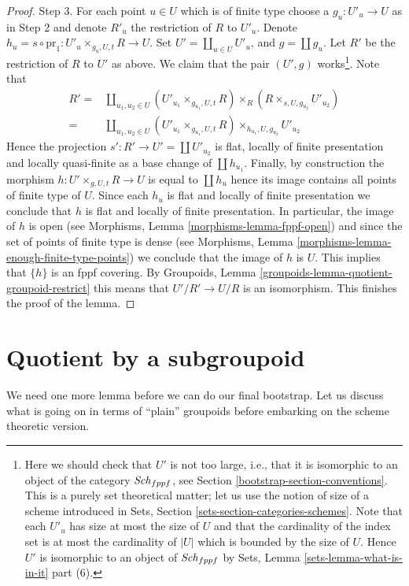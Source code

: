 \begin{proof}
\medskip\noindent
Step 3. For each point $u \in U$ which is of finite type
choose a $g_u : U'_u \to U$ as in
Step 2 and denote $R'_u$ the restriction of $R$ to $U'_u$.
Denote $h_u = s \circ \text{pr}_1 : U'_u \times_{g_u, U, t} R \to U$. Set
$U' = \coprod_{u \in U} U'_u$, and $g = \coprod g_u$. Let $R'$ be the
restriction of $R$ to $U'$ as above. We claim that
the pair $(U', g)$ works\footnote{Here we should check that $U'$ is not
too large, i.e., that it is isomorphic to an object of the category
$\mathit{Sch}_{fppf}$, see
Section \ref{bootstrap-section-conventions}.
This is a purely set theoretical matter; let us use the notion of size of
a scheme introduced in
Sets, Section \ref{sets-section-categories-schemes}.
Note that each $U'_u$ has size at most the size of $U$
and that the cardinality of the index set is at most the cardinality of
$|U|$ which is bounded by the size of $U$. Hence $U'$ is isomorphic
to an object of $\mathit{Sch}_{fppf}$ by
Sets, Lemma \ref{sets-lemma-what-is-in-it} part (6).}.
Note that
\begin{align*}
R' = &
\coprod\nolimits_{u_1, u_2 \in U}
(U'_{u_1} \times_{g_{u_1}, U, t} R)
\times_R
(R \times_{s, U, g_{u_2}} U'_{u_2}) \\
= &
\coprod\nolimits_{u_1, u_2 \in U}
(U'_{u_1} \times_{g_{u_1}, U, t} R) \times_{h_{u_1}, U, g_{u_2}} U'_{u_2}
\end{align*}
Hence the projection $s' : R' \to U' = \coprod U'_{u_2}$
is flat, locally of finite
presentation and locally quasi-finite as a base change of $\coprod h_{u_1}$.
Finally, by construction the morphism
$h : U' \times_{g, U, t} R \to U$ is equal to $\coprod h_u$ hence
its image contains all points of finite type of $U$.
Since each $h_u$ is flat and locally of finite presentation we conclude that
$h$ is flat and locally of finite presentation.
In particular, the image of $h$ is open (see
Morphisms, Lemma \ref{morphisms-lemma-fppf-open})
and since the set of points of finite type is dense (see
Morphisms, Lemma \ref{morphisms-lemma-enough-finite-type-points})
we conclude that the image of $h$ is $U$. This implies that
$\{h\}$ is an fppf covering. By
Groupoids, Lemma \ref{groupoids-lemma-quotient-groupoid-restrict}
this means that $U'/R' \to U/R$ is an isomorphism.
This finishes the proof of the lemma.
\end{proof}

\section{Quotient by a subgroupoid}
\label{bootstrap-section-dividing}
We need one more lemma before we can do our final bootstrap.
Let us discuss what is going on in terms of ``plain'' groupoids before
embarking on the scheme theoretic version.

